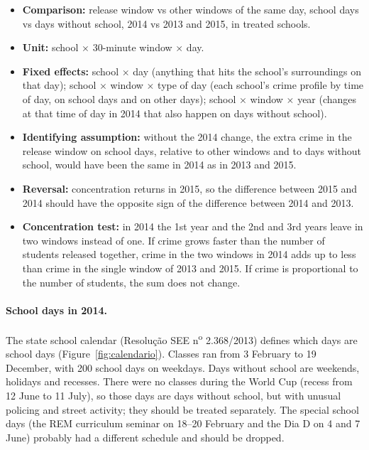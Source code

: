 \documentclass[11pt]{article}
\begin{document}
\begin{itemize}
  \item \textbf{Comparison:} release window vs other windows of the same day,
        school days vs days without school, 2014 vs 2013 and 2015, in treated
        schools.
  \item \textbf{Unit:} school $\times$ 30-minute window $\times$ day.
  \item \textbf{Fixed effects:} school $\times$ day (anything that hits the
        school's surroundings on that day); school $\times$ window $\times$ type
        of day (each school's crime profile by time of day, on school days and
        on other days); school $\times$ window $\times$ year (changes at that
        time of day in 2014 that also happen on days without school).
  \item \textbf{Identifying assumption:} without the 2014 change, the extra
        crime in the release window on school days, relative to other windows
        and to days without school, would have been the same in 2014 as in
        2013 and 2015.
  \item \textbf{Reversal:} concentration returns in 2015, so the difference
        between 2015 and 2014 should have the opposite sign of the difference
        between 2014 and 2013.
  \item \textbf{Concentration test:} in 2014 the 1st year and the 2nd and 3rd
        years leave in two windows instead of one. If crime grows faster than
        the number of students released together, crime in the two windows in
        2014 adds up to less than crime in the single window of 2013 and 2015.
        If crime is proportional to the number of students, the sum does not
        change.
\end{itemize}

\paragraph{School days in 2014.} The state school calendar
(Resolu\c{c}\~ao SEE n\textsuperscript{o} 2.368/2013) defines which days are
school days (Figure~\ref{fig:calendario}). Classes ran from 3 February to 19
December, with 200 school days on weekdays. Days without school are weekends,
holidays and recesses. There were no classes during the World Cup (recess from
12 June to 11 July), so those days are days without school, but with unusual
policing and street activity; they should be treated separately. The special
school days (the REM curriculum seminar on 18--20 February and the Dia D on 4
and 7 June) probably had a different schedule and should be dropped.
\end{document}
